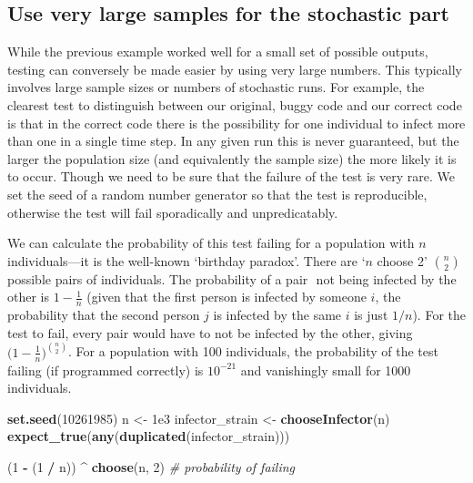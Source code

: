 \documentclass[10pt,letterpaper]{article}
\newenvironment{Shaded}{\begin{snugshade}}{\end{snugshade}}
\newcommand{\CommentTok}[1]{\textcolor[rgb]{0.56,0.35,0.01}{\textit{#1}}}
\newcommand{\DecValTok}[1]{\textcolor[rgb]{0.00,0.00,0.81}{#1}}
\newcommand{\FloatTok}[1]{\textcolor[rgb]{0.00,0.00,0.81}{#1}}
\newcommand{\KeywordTok}[1]{\textcolor[rgb]{0.13,0.29,0.53}{\textbf{#1}}}
\newcommand{\NormalTok}[1]{#1}
\newcommand{\OperatorTok}[1]{\textcolor[rgb]{0.81,0.36,0.00}{\textbf{#1}}}
\newcommand{\StringTok}[1]{\textcolor[rgb]{0.31,0.60,0.02}{#1}}
\begin{document}
\hypertarget{largesamples}{%
\subsection*{Use very large samples for the stochastic part}\label{largesamples}}

While the previous example worked well for a small set of possible outputs, testing can conversely be made easier by using very large numbers.
This typically involves large sample sizes or numbers of stochastic runs.
For example, the clearest test to distinguish between our original, buggy code and our correct code is that in the correct code there is the possibility for one individual to infect more than one in a single time step.
In any given run this is never guaranteed, but the larger the population size (and equivalently the sample size) the more likely it is to occur.
Though we need to be sure that the failure of the test is very rare.
We set the seed of a random number generator so that the test is reproducible, otherwise the test will fail sporadically and unpredicatably.

We can calculate the probability of this test failing for a population with \(n\) individuals---it is the well-known `birthday paradox'.
There are `\(n\) choose 2' \(\binom{n}{2}\) possible pairs of individuals.
The probability of a pair \(<i,j>\) not being infected by the other is \(1-\frac{1}{n}\) (given that the first person is infected by someone \(i\), the probability that the second person \(j\) is infected by the same \(i\) is just \(1/n\)).
For the test to fail, every pair would have to not be infected by the other, giving \(\big(1-\frac{1}{n}\big) ^ {\binom{n}{2}}\).
For a population with 100 individuals, the probability of the test failing (if programmed correctly) is \(10^{-21}\) and vanishingly small for 1000 individuals.
\newline
{}\label{test_stoch_largenum}

\begin{Shaded}
\begin{Highlighting}[]
\KeywordTok{set.seed}\NormalTok{(}\DecValTok{10261985}\NormalTok{)}
\NormalTok{n <-}\StringTok{ }\FloatTok{1e3}
\NormalTok{infector_strain <-}\StringTok{ }\KeywordTok{chooseInfector}\NormalTok{(n)}
\KeywordTok{expect_true}\NormalTok{(}\KeywordTok{any}\NormalTok{(}\KeywordTok{duplicated}\NormalTok{(infector_strain)))}

\NormalTok{(}\DecValTok{1} \OperatorTok{-}\StringTok{ }\NormalTok{(}\DecValTok{1} \OperatorTok{/}\StringTok{ }\NormalTok{n)) }\OperatorTok{^}\StringTok{ }\KeywordTok{choose}\NormalTok{(n, }\DecValTok{2}\NormalTok{) }\CommentTok{# probability of failing}
\end{Highlighting}
\end{Shaded}
\end{document}
